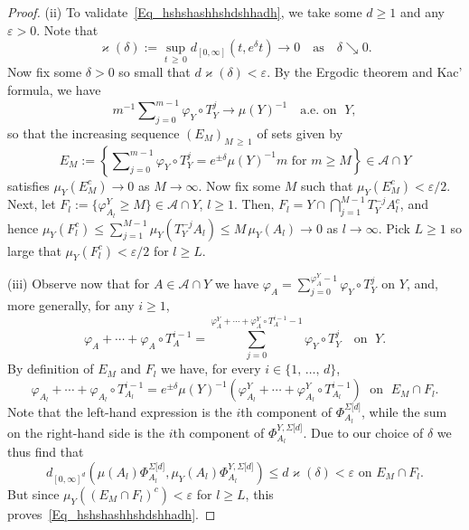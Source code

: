 \documentclass[10pt]{amsart}
\theoremstyle{definition}\newtheorem{defi}[theo]{Definition}\newtheorem{rema}[theo]{Remark}\newtheorem{exam}[theo]{Example}\newtheorem{exem}[theo]{Example}\newtheorem{nota}[theo]{Notation}
\newcommand{\clA}{\mathcal{A}}
\begin{document}
\begin{proof}
\noindent(ii)  To validate~\eqref{Eq_hshshashhshdshhadh}, we take some $d\geq1$ and any $\varepsilon>0$. Note that 
\[
\varkappa(\delta):=\sup_{t\,\geq\,0}d_{[0,\infty]}\left(t,e^{\delta}t\right)\rightarrow0\quad \text{as}\quad\delta\searrow0.
\]
Now fix some $\delta>0$ so small that $d\varkappa(\delta)<\varepsilon$. By the Ergodic theorem and Kac' formula, we have
\begin{equation}
m^{-1} {\textstyle\sum\nolimits_{j=0}^{m-1}}
\varphi_{Y}\circ T_{Y}^{j}\longrightarrow\mu(Y)^{-1}\quad\text{a.e. on }\;Y,
\end{equation}
so that the increasing sequence $(E_{M})_{M\,\geq\,1}$ of sets given by
\[
E_{M}:=\left\{ {\textstyle\sum\nolimits_{j=0}^{m-1}}
\varphi_{Y}\circ T_{Y}^{j}=e^{\pm\delta}\mu(Y)^{-1}m\text{ for }m\geq M\right\}\in\clA\cap Y
\]
satisfies $\mu_{Y}(E_{M}^{c})\rightarrow0$ as $M\rightarrow\infty$. Now fix some $M$ such that $\mu_{Y}(E_{M}^{c})<\varepsilon/2$. Next, let $F_{l}:=\{\varphi_{A_{l}}^{Y}\geq M\}\in\clA\cap Y$, $l\geq1$. Then, $F_{l}=Y\cap {\textstyle\bigcap\nolimits_{j=1}^{M-1}} T_{Y}^{-j}A_{l}^{c}$, and hence $\mu_{Y}(F_{l}^{c})\leq\sum_{j=1}^{M-1}\mu _{Y}(T_{Y}^{-j}A_{l})\leq M\,\mu_{Y}(A_{l})\rightarrow0$ as $l\rightarrow
\infty$. Pick $L\geq1$ so large that $\mu_{Y}(F_{l}^{c})<\varepsilon/2$ for $l\geq L$.

\vspace{6pt}
\noindent(iii) Observe now that for $A\in
\clA\cap Y$ we have $\varphi_{A}=\sum_{j=0}^{\varphi_{A}^{Y}-1}
\varphi_{Y}\circ T_{Y}^{j}\,\ $on $Y$, and, more generally, for any $i\geq1$,
\begin{equation}
\varphi_{A}+\cdots+\varphi_{A}\circ T_{A}^{i-1}=\sum_{j=0}^{\varphi_{A} ^{Y}+\cdots+\varphi_{A}^{Y}\circ T_{A}^{i-1}-1}\varphi_{Y}\circ T_{Y} ^{j} \quad \text{on }\; Y.
\end{equation}
By definition of $E_{M}$ and $F_{l}$ we have, for every $i\in\{1,\,\ldots,\,d\}$,
\[
\varphi_{A_{l}}+\cdots+\varphi_{A_{l}}\circ T_{A_{l}}^{i-1}=e^{\pm\delta}
\mu(Y)^{-1}\left(\varphi_{A_{l}}^{Y}+\cdots+\varphi_{A_{l}}^{Y}\circ T_{A_{l}}^{i-1}\right)\; \text{ on }\; E_{M}\cap F_{l}.
\]
Note that the left-hand expression is the $i$th component of $\Phi_{A_{l} }^{\Sigma\lbrack d]}$, while the sum on the right-hand side is the $i$th component of $\Phi_{A_{l}}^{Y,\Sigma\lbrack d]}$. Due to our choice of $\delta$ we thus find that
\[
d_{[0,\infty]^{d}}\left(\mu(A_{l})\Phi_{A_{l}}^{\Sigma\lbrack d]},\mu _{Y}(A_{l})\Phi_{A_{l}}^{Y,\Sigma\lbrack d]}\right) \leq d\varkappa (\delta)<\varepsilon\text{ on }E_{M}\cap F_{l}\text{.}
\]
But since $\mu_{Y}((E_{M}\cap F_{l})^{c})<\varepsilon$ for $l\geq L$, this proves~\eqref{Eq_hshshashhshdshhadh}.\qedhere
\end{proof}
\end{document}
